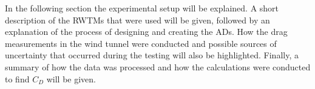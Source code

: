 
In the following section the experimental setup will be explained. A short description of the \gls{RWTM}s that were used will be given, followed by an explanation of the process of designing and creating the \gls{AD}s. How the drag measurements in the wind tunnel were conducted and possible sources of uncertainty that occurred during the testing will also be highlighted. Finally, a summary of how the data was processed and how the calculations were conducted to find $C_D$ will be given. 




